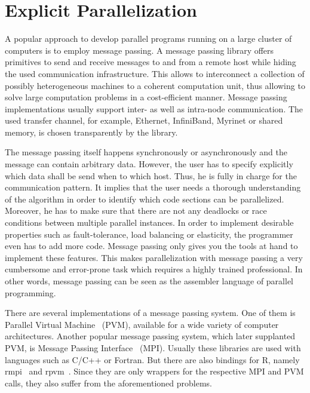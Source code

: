 \section{Explicit Parallelization}

A popular approach to develop parallel programs running on a large cluster of computers is to employ message passing.
A message passing library offers primitives to send and receive messages to and from a remote host while hiding the used communication infrastructure.
This allows to interconnect a collection of possibly heterogeneous machines to a coherent computation unit, thus allowing to solve large computation problems in a cost-efficient manner.
Message passing implementations usually support inter- as well as intra-node communication.
The used transfer channel, for example, Ethernet, InfiniBand, Myrinet or shared memory, is chosen transparently by the library.

The message passing itself happens synchronously or asynchronously and the message can contain arbitrary data.
However, the user has to specify explicitly which data shall be send when to which host.
Thus, he is fully in charge for the communication pattern.
It implies that the user needs a thorough understanding of the algorithm in order to identify which code sections can be parallelized.
Moreover, he has to make sure that there are not any deadlocks or race conditions between multiple parallel instances.
In order to implement desirable properties such as fault-tolerance, load balancing or elasticity, the programmer even has to add more code.
Message passing only gives you the tools at hand to implement these features.
This makes parallelization with message passing a very cumbersome and error-prone task which requires a highly trained professional.
In other words, message passing can be seen as the assembler language of parallel programming.

There are several implementations of a message passing system.
One of them is Parallel Virtual Machine~\cite{geist:1994a} (PVM), available for a wide variety of computer architectures.
Another popular message passing system, which later supplanted PVM, is Message Passing Interface~\cite{lusk:2009a} (MPI).
Usually these libraries are used with languages such as C/C++ or Fortran.
But there are also bindings for R, namely rmpi~\cite{rmpi} and rpvm~\cite{rpvm}.
Since they are only wrappers for the respective MPI and PVM calls, they also suffer from the aforementioned problems.

